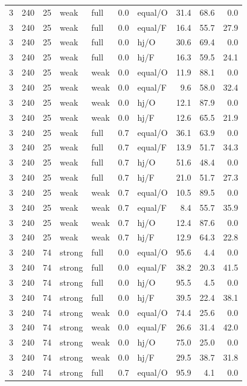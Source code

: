 {\begin{longtable}{@{}rrrllllrrr@{}}
3 & 240 & 25 & weak & full & 0.0 & equal/O & 31.4 & 68.6 & 0.0\\
3 & 240 & 25 & weak & full & 0.0 & equal/F & 16.4 & 55.7 & 27.9\\
3 & 240 & 25 & weak & full & 0.0 & hj/O & 30.6 & 69.4 & 0.0\\
3 & 240 & 25 & weak & full & 0.0 & hj/F & 16.3 & 59.5 & 24.1\\
3 & 240 & 25 & weak & weak & 0.0 & equal/O & 11.9 & 88.1 & 0.0\\
3 & 240 & 25 & weak & weak & 0.0 & equal/F & 9.6 & 58.0 & 32.4\\
3 & 240 & 25 & weak & weak & 0.0 & hj/O & 12.1 & 87.9 & 0.0\\
3 & 240 & 25 & weak & weak & 0.0 & hj/F & 12.6 & 65.5 & 21.9\\
3 & 240 & 25 & weak & full & 0.7 & equal/O & 36.1 & 63.9 & 0.0\\
3 & 240 & 25 & weak & full & 0.7 & equal/F & 13.9 & 51.7 & 34.3\\
3 & 240 & 25 & weak & full & 0.7 & hj/O & 51.6 & 48.4 & 0.0\\
3 & 240 & 25 & weak & full & 0.7 & hj/F & 21.0 & 51.7 & 27.3\\
3 & 240 & 25 & weak & weak & 0.7 & equal/O & 10.5 & 89.5 & 0.0\\
3 & 240 & 25 & weak & weak & 0.7 & equal/F & 8.4 & 55.7 & 35.9\\
3 & 240 & 25 & weak & weak & 0.7 & hj/O & 12.4 & 87.6 & 0.0\\
3 & 240 & 25 & weak & weak & 0.7 & hj/F & 12.9 & 64.3 & 22.8\\
3 & 240 & 74 & strong & full & 0.0 & equal/O & 95.6 & 4.4 & 0.0\\
3 & 240 & 74 & strong & full & 0.0 & equal/F & 38.2 & 20.3 & 41.5\\
3 & 240 & 74 & strong & full & 0.0 & hj/O & 95.5 & 4.5 & 0.0\\
3 & 240 & 74 & strong & full & 0.0 & hj/F & 39.5 & 22.4 & 38.1\\
3 & 240 & 74 & strong & weak & 0.0 & equal/O & 74.4 & 25.6 & 0.0\\
3 & 240 & 74 & strong & weak & 0.0 & equal/F & 26.6 & 31.4 & 42.0\\
3 & 240 & 74 & strong & weak & 0.0 & hj/O & 75.0 & 25.0 & 0.0\\
3 & 240 & 74 & strong & weak & 0.0 & hj/F & 29.5 & 38.7 & 31.8\\
3 & 240 & 74 & strong & full & 0.7 & equal/O & 95.9 & 4.1 & 0.0\\

\end{longtable}}
